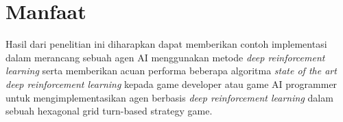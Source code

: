 \section{Manfaat}
\label{sec:manfaat}

Hasil dari penelitian ini diharapkan dapat memberikan contoh implementasi dalam merancang 
sebuah agen AI menggunakan metode \emph{deep reinforcement learning} serta memberikan acuan performa beberapa algoritma \emph{state of the art deep reinforcement learning} kepada game developer atau game AI programmer untuk 
mengimplementasikan agen berbasis \emph{deep reinforcement learning} dalam sebuah hexagonal grid turn-based strategy game.
